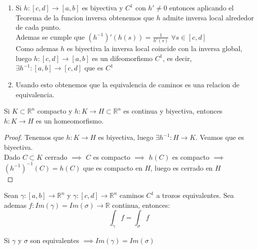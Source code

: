 \begin{observación}
\vspace{-2.5em}
\begin{enumerate}
    \item Si $h:[c,d] \to [a,b]$ es biyectiva y $C^1$ con $h' \neq 0$ entonces aplicando
          el Teorema de la funcion inversa obtenemos que $h$ admite inversa local
          alrededor de cada punto. \\ Ademas se cumple que $(h^{-1})'(h(s)) =
              \frac{1}{h'(s)}$ $\forall s \in [c,d]$ \\ Como ademas $h$ es biyectiva la
          inversa local coincide con la inversa global, luego $h:[c,d] \to [a,b]$ es un
          difeomorfismo $C^1$, es decir, $\exists h^{-1}:[a,b] \to [c,d]$ que es $C^1$
    \item Usando esto obtenemos que la equivalencia de caminos es una relacion de
          equivalencia.
\end{enumerate}
\end{observación}

\begin{observación}
Si $K\subset \mathbb{R}^n$ compacto y $h:K \to H\subset \mathbb{R}^n$ es continua y biyectiva, entonces $h:K \to H$ es un homeomorfismo.
\end{observación}

\begin{proof}
    Tenemos que $h:K \to H$ es biyectiva, luego $\exists h^{-1}:H \to K$. Veamos que es biyectiva. \\
    Dado $C \subset K$ cerrado $\implies$ $C$ es compacto $\implies$ $h(C)$ es compacto $\implies$ $(h^{-1})^{-1}(C)=h(C)$ que es compacto en $H$, luego es cerrado en $H$ \\
\end{proof}

\begin{teorema}
    Sean $\gamma: [a,b] \to \mathbb{R}^n$ y $\gamma:[c,d] \to \mathbb{R}^n$ caminos $C^1$ a trozos equivalentes. Sea ademas $f:Im(\gamma)=Im(\sigma) \to \mathbb{R}$ continua, entonces: \\
    $$\int_{\gamma}f=\int_{\sigma}f$$
\end{teorema}

\begin{observación}
Si $\gamma$ y $\sigma$ son equivalentes $\implies Im(\gamma)=Im(\sigma)$
\end{observación}


